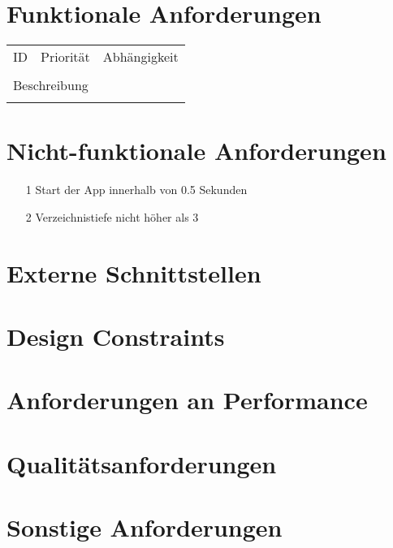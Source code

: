 \section{Funktionale Anforderungen}
	\begin{tabularx}{\textwidth}{|l|l|l|}
		ID & Priorität & Abhängigkeit \\
		   &           &              \\
		\hline
		\multicolumn{3}{l}{Beschreibung}\\
		\multicolumn{3}{l}{}\\
		\hline		 
	\end{tabularx}

\section{Nicht-funktionale Anforderungen}
	\begin{itemize}
		\item[1] Start der App innerhalb von 0.5 Sekunden
		\item[2] Verzeichnistiefe nicht höher als 3
	\end{itemize}
	
\section{Externe Schnittstellen}
\section{Design Constraints}
\section{Anforderungen an Performance}
\section{Qualitätsanforderungen}
\section{Sonstige Anforderungen}
